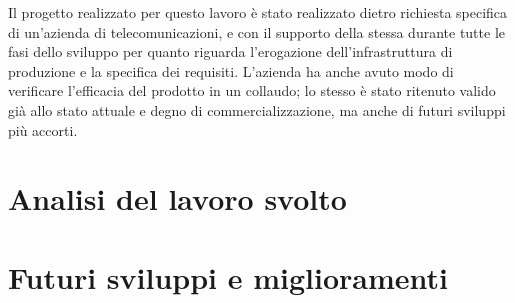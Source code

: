Il progetto realizzato per questo lavoro è stato realizzato dietro richiesta specifica di un'azienda di telecomunicazioni, e con il supporto della stessa durante tutte le fasi dello sviluppo per quanto riguarda l'erogazione dell'infrastruttura di produzione e la specifica dei requisiti. L'azienda ha anche avuto modo di verificare l'efficacia del prodotto in un collaudo; lo stesso è stato ritenuto valido già allo stato attuale e degno di commercializzazione, ma anche di futuri sviluppi più accorti.

\section{Analisi del lavoro svolto}

\section{Futuri sviluppi e miglioramenti}